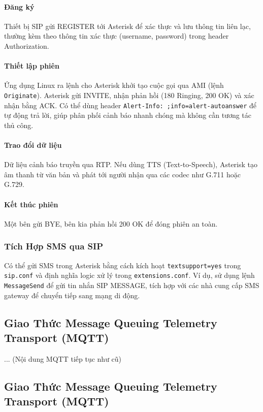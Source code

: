 \paragraph{Đăng ký}
Thiết bị SIP gửi REGISTER tới Asterisk để xác thực và lưu thông tin liên lạc, thường kèm theo thông tin xác thực (username, password) trong header Authorization.

\paragraph{Thiết lập phiên}
Ứng dụng Linux ra lệnh cho Asterisk khởi tạo cuộc gọi qua AMI (lệnh \texttt{Originate}). Asterisk gửi INVITE, nhận phản hồi (180 Ringing, 200 OK) và xác nhận bằng ACK. Có thể dùng header \texttt{Alert-Info: ;info=alert-autoanswer} để tự động trả lời, giúp phân phối cảnh báo nhanh chóng mà không cần tương tác thủ công.

\paragraph{Trao đổi dữ liệu}
Dữ liệu cảnh báo truyền qua RTP. Nếu dùng TTS (Text-to-Speech), Asterisk tạo âm thanh từ văn bản và phát tới người nhận qua các codec như G.711 hoặc G.729.

\paragraph{Kết thúc phiên}
Một bên gửi BYE, bên kia phản hồi 200 OK để đóng phiên an toàn.

\subsubsection{Tích Hợp SMS qua SIP}
\label{subsubsec:sip_sms}

Có thể gửi SMS trong Asterisk bằng cách kích hoạt \texttt{textsupport=yes} trong \texttt{sip.conf} và định nghĩa logic xử lý trong \texttt{extensions.conf}. Ví dụ, sử dụng lệnh \texttt{MessageSend} để gửi tin nhắn SIP MESSAGE, tích hợp với các nhà cung cấp SMS gateway để chuyển tiếp sang mạng di động.


\subsection{Giao Thức Message Queuing Telemetry Transport (MQTT)}
\label{subsec:mqtt_protocol}
... (Nội dung MQTT tiếp tục như cũ)
\subsection{Giao Thức Message Queuing Telemetry Transport (MQTT)}
\label{subsec:mqtt_protocol}

